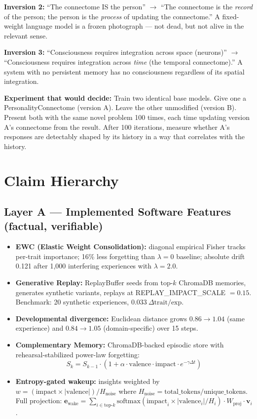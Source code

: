 \documentclass[11pt,a4paper]{article}
\begin{document}
\textbf{Inversion 2:} ``The connectome IS the person'' $\to$ ``The connectome is the
\textit{record} of the person; the person is the \textit{process} of updating the
connectome.'' A fixed-weight language model is a frozen photograph — not dead, but not
alive in the relevant sense.

\textbf{Inversion 3:} ``Consciousness requires integration across space (neurons)'' $\to$
``Consciousness requires integration across \textit{time} (the temporal connectome).'' A
system with no persistent memory has no consciousness regardless of its spatial
integration.

\textbf{Experiment that would decide:} Train two identical base models. Give one a
PersonalityConnectome (version A). Leave the other unmodified (version B). Present both
with the same novel problem 100 times, each time updating version A's connectome from the
result. After 100 iterations, measure whether A's responses are detectably shaped by its
history in a way that correlates with the history.

\section{Claim Hierarchy}

\subsection{Layer A — Implemented Software Features (factual, verifiable)}

\begin{itemize}[leftmargin=*]
  \item \textbf{EWC (Elastic Weight Consolidation):} diagonal empirical Fisher tracks
  per-trait importance; 16\% less forgetting than $\lambda=0$ baseline; absolute drift
  0.121 after 1{,}000 interfering experiences with $\lambda=2.0$.
  \item \textbf{Generative Replay:} ReplayBuffer seeds from top-$k$ ChromaDB memories,
  generates synthetic variants, replays at REPLAY\_IMPACT\_SCALE $= 0.15$. Benchmark:
  20 synthetic experiences, $0.033\ \Delta\text{trait}/\text{exp}$.
  \item \textbf{Developmental divergence:} Euclidean distance grows $0.86 \to 1.04$ (same
  experience) and $0.84 \to 1.05$ (domain-specific) over 15 steps.
  \item \textbf{Complementary Memory:} ChromaDB-backed episodic store with
  rehearsal-stabilized power-law forgetting:
  \[
    S_k = S_{k-1} \cdot (1 + \alpha \cdot \text{valence} \cdot \text{impact}
    \cdot e^{-\gamma \Delta t})
  \]
  \item \textbf{Entropy-gated wakeup:} insights weighted by
  $w = (\text{impact} \times |\text{valence}|) / H_{\text{noise}}$ where
  $H_{\text{noise}} = \text{total\_tokens} / \text{unique\_tokens}$.
  Full projection: $\mathbf{e}_{\text{wake}} = \sum_{i \in \text{top-}k}
  \text{softmax}(\text{impact}_i \times |\text{valence}_i| / H_i) \cdot W_{\text{proj}}
  \cdot \mathbf{v}_i$.
\end{itemize}
\end{document}
